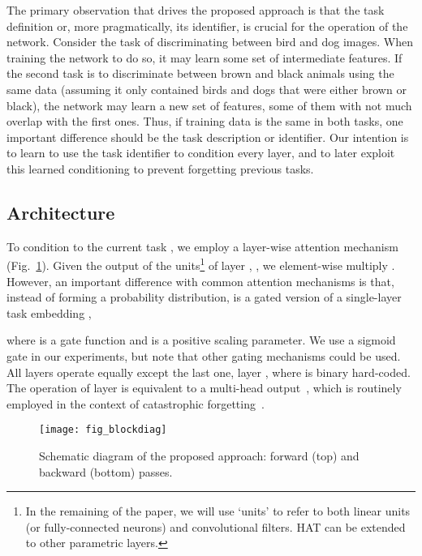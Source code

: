 The primary observation that drives the proposed approach is that the task definition or, more pragmatically, its identifier, is crucial for the operation of the network. Consider the task of discriminating between bird and dog images. When training the network to do so, it may learn some set of intermediate features. If the second task is to discriminate between brown and black animals using the same data (assuming it only contained birds and dogs that were either brown or black), the network may learn a new set of features, some of them with not much overlap with the first ones. Thus, if training data is the same in both tasks, one important difference should be the task description or identifier. Our intention is to learn to use the task identifier to condition every layer, and to later exploit this learned conditioning to prevent forgetting previous tasks. 

\subsection{Architecture}
\label{sec:Method_Arch}

To condition to the current task , we employ a layer-wise attention mechanism (Fig.~\ref{fig:blockdiag}). Given the output of the units\footnote{In the remaining of the paper, we will use `units' to refer to both linear units (or fully-connected neurons) and convolutional filters. HAT can be extended to other parametric layers.} of layer , , we element-wise multiply . 
However, an important difference with common attention mechanisms is that, instead of forming a probability distribution,  is a gated version of a single-layer task embedding ,

where  is a gate function and  is a positive scaling parameter. We use a sigmoid gate in our experiments, but note that other gating mechanisms could be used. All layers  operate equally except the last one, layer , where  is binary hard-coded. The operation of layer  is equivalent to a multi-head output~\cite{Bakker02JMLR}, which is routinely employed in the context of catastrophic forgetting~\citep[for example][]{Rusu16ARXIV,Li17PAMI,Nguyen17ARXIV}.

\begin{figure}[t]
\begin{center}
	\texttt{[image: fig\_blockdiag]}
    \vskip -0.1in
\caption{Schematic diagram of the proposed approach: forward (top) and backward (bottom) passes.}
	\label{fig:blockdiag}
	\end{center}
	\vskip -0.1in
\end{figure} 

